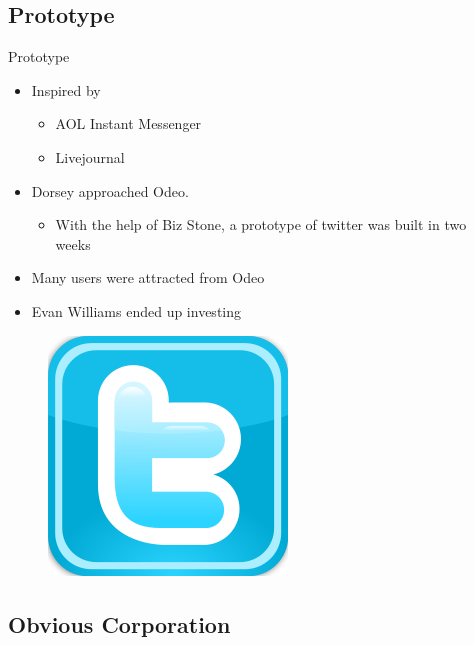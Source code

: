 \documentclass[xcolor=svgnames,handout]{beamer}
\begin{document}
\subsection{Prototype}
\begin{frame}{Prototype}
	\begin{itemize}
		\item Inspired by
			\begin{itemize}
				\item AOL Instant Messenger~\cite{jackdorsey2006}
				\item Livejournal~\cite{jackdorsey2006}
			\end{itemize}
		\item Dorsey approached Odeo.
			\begin{itemize}
				\item With the help of Biz Stone, a prototype of twitter was built in two weeks~\cite{markglaser2007}
			\end{itemize}
			\item Many users were attracted from Odeo~\cite{markglaser2007}
			\item Evan Williams ended up investing~\cite{markglaser2007}
	\end{itemize}
	\begin{figure}[h]
		\centering
		\includegraphics[scale=0.10]{twitter-logo.png}
		\caption{\cite{enow2011}}
	\end{figure}
\end{frame}

\subsection{Obvious Corporation}
\end{document}
